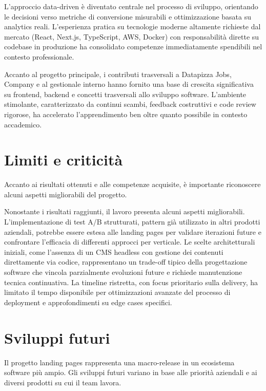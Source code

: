 \medskip
L'approccio data-driven è diventato centrale nel processo di sviluppo, orientando 
le decisioni verso metriche di conversione misurabili e ottimizzazione basata su 
analytics reali. L'esperienza pratica su tecnologie moderne altamente richieste 
dal mercato (React, Next.js, TypeScript, AWS, Docker) con responsabilità dirette 
su codebase in produzione ha consolidato competenze immediatamente spendibili nel 
contesto professionale.

\medskip
Accanto al progetto principale, i contributi trasversali a Datapizza Jobs, Company
e al gestionale interno hanno fornito una base di crescita significativa su frontend, 
backend e concetti trasversali allo sviluppo software. L'ambiente stimolante, 
caratterizzato da continui scambi, feedback costruttivi e code review rigorose, 
ha accelerato l'apprendimento ben oltre quanto possibile in contesto accademico.

\section{Limiti e criticità}
Accanto ai risultati ottenuti e alle competenze acquisite, è importante riconoscere 
alcuni aspetti migliorabili del progetto.


\medskip
Nonostante i risultati raggiunti, il lavoro presenta alcuni aspetti migliorabili. 
L'implementazione di test A/B strutturati, pattern già utilizzato in altri 
prodotti aziendali, potrebbe essere estesa alle landing pages per validare 
iterazioni future e confrontare l'efficacia di differenti approcci per verticale. 
Le scelte architetturali iniziali, come l'assenza di un CMS headless con gestione 
dei contenuti direttamente via codice, rappresentano un trade-off tipico della 
progettazione software che vincola parzialmente evoluzioni future e richiede 
manutenzione tecnica continuativa. La timeline ristretta, con focus prioritario 
sulla delivery, ha limitato il tempo disponibile per ottimizzazioni avanzate del 
processo di deployment e approfondimenti su edge cases specifici.

\section{Sviluppi futuri}

Il progetto landing pages rappresenta una macro-release in un ecosistema software 
più ampio. Gli sviluppi futuri variano in base alle priorità aziendali e ai diversi 
prodotti su cui il team lavora.

